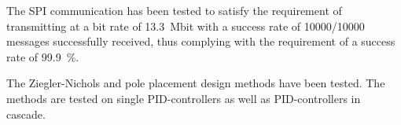 \documentclass[../../main.tex]{subfiles}
\begin{document}
The SPI communication has been tested to satisfy the requirement of transmitting at a bit rate of \SI{13,3}{\mega bit} with a success rate of 10000/10000 messages successfully received, thus complying with the requirement of a success rate of \SI{99,9}{\percent}.

The Ziegler-Nichols and pole placement design methods have been tested. The methods are tested on single PID-controllers as well as PID-controllers in cascade. 
\end{document}
